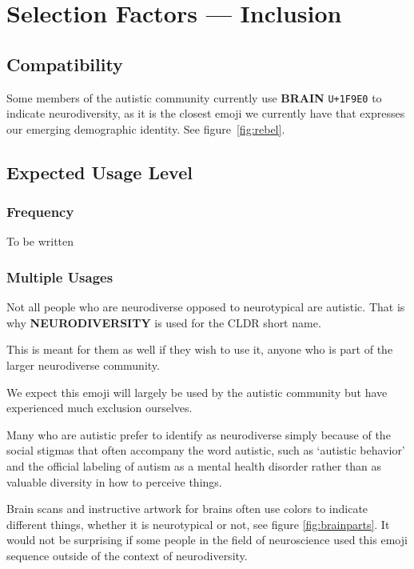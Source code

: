 \section{Selection Factors --- Inclusion}

\subsection{Compatibility}
Some members of the autistic community currently use \textbf{BRAIN} \texttt{U+1F9E0} to indicate neurodiversity, as it is the closest emoji we currently have that expresses our emerging demographic identity. See figure~\ref{fig:rebel}.

\subsection{Expected Usage Level}

\subsubsection{Frequency}

To be written

\subsubsection{Multiple Usages}

Not all people who are neurodiverse opposed to neurotypical are autistic. That is why \textbf{NEURODIVERSITY} is used for the CLDR short name.

This is meant for them as well if they wish to use it, anyone who is part of the larger neurodiverse community.

We expect this emoji will largely be used by the autistic community but have experienced much exclusion ourselves.

Many who are autistic prefer to identify as neurodiverse simply because of the social stigmas that often accompany the word autistic, such as `autistic behavior' and the official labeling of autism as a mental health disorder rather than as valuable diversity in how to perceive things.

Brain scans and instructive artwork for brains often use colors to indicate different things, whether it is neurotypical or not, see figure \ref{fig:brainparts}. It would not be surprising if some people in the field of neuroscience used this emoji sequence outside of the context of neurodiversity.

